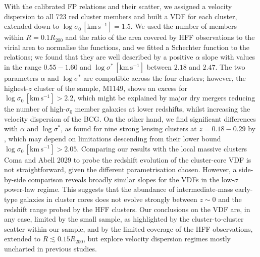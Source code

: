 \documentclass{aa}
\begin{document}
With the calibrated FP relations and their scatter, we assigned a velocity dispersion to all 723 red cluster members and built a VDF for each cluster, extended down to $\log \sigma_0\, [\mathrm{km\,s^{-1}}]=1.5$. We used the number of members within $R=0.1R_{200}$ and the ratio of the area covered by HFF observations to the virial area to normalise the functions, and we fitted a Schechter function to the relations; we found that they are well described by a positive $\alpha$ slope with values in the range $0.55-1.60$ and $\log\sigma^*\, [\mathrm{km\,s^{-1}}]$ between $2.18$ and $2.47$. The two parameters $\alpha$ and $\log\sigma^*$ are compatible across the four clusters; however, the highest-$z$ cluster of the sample, M1149, shows an excess for $\log\sigma_0\, [\mathrm{km\,s^{-1}}]>2.2$, which might be explained by major dry mergers reducing the number of high-$\sigma_0$ member galaxies at lower redshifts, whilst increasing the velocity dispersion of the BCG. On the other hand, we find significant differences with $\alpha$ and $\log\sigma^*$, as found for nine strong lensing clusters at $z=0.18-0.29$ by \citet{sohn20}, which may depend on limitations descending from their lower bound $\log\sigma_0\, [\mathrm{km\,s^{-1}}]>2.05$. Comparing our results with the local massive clusters Coma and Abell 2029 \citep[][]{sohn17} to probe the redshift evolution of the cluster-core VDF is not straightforward, given the different parametrisation chosen. However, a side-by-side comparison reveals broadly similar slopes for the VDFs in the low-$\sigma$ power-law regime. This suggests that the abundance of intermediate-mass early-type galaxies in cluster cores does not evolve strongly between $z\sim0$ and the redshift range probed by the HFF clusters. Our conclusions on the VDF are, in any case, limited by the small sample, as highlighted by the cluster-to-cluster scatter within our sample, and by the limited coverage of the HFF observations, extended to $R\lesssim0.15R_{200}$, but explore velocity dispersion regimes mostly uncharted in previous studies. 
\end{document}
